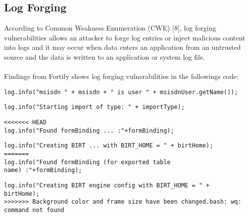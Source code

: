 \documentclass[11pt,a4paper]{article}
\theoremstyle{definition}
\begin{document}
\subsection{Log Forging}
According to Common Weakness Enumeration (CWE) [8], log forging vulnerabilities allows an attacker to forge log entries or inject malicious content into logs and it may occur when data enters an application from an untrusted source and the data is written to an application or system log file.\\\\
Findings from Fortify shows log forging vulnerabilities in the followings code: 


\begin{lstlisting}[caption=DataImportServlet.java:124]
log.info("msisdn " + msisdn + " is user " + msisdnUser.getName());
\end{lstlisting}

\begin{lstlisting}[caption=ImportServlet.java:77]
log.info("Starting import of type: " + importType);
\end{lstlisting}

\begin{lstlisting}[caption=ReExportAllFormData.java:88]
<<<<<<< HEAD
log.info("Found formBinding ... :"+formBinding);
\end{lstlisting}

\begin{lstlisting}[caption=ReportManager.java:125]
log.info("Creating BIRT ... with BIRT_HOME = " + birtHome);
=======
log.info("Found formBinding (for exported table 
name) :"+formBinding);
\end{lstlisting}

\begin{lstlisting}[caption=ReportManager.java:125]
log.info("Creating BIRT engine config with BIRT_HOME = " + 
birtHome);
>>>>>>> Background color and frame size have been changed.bash: wq: command not found
\end{lstlisting} 
\end{document}
